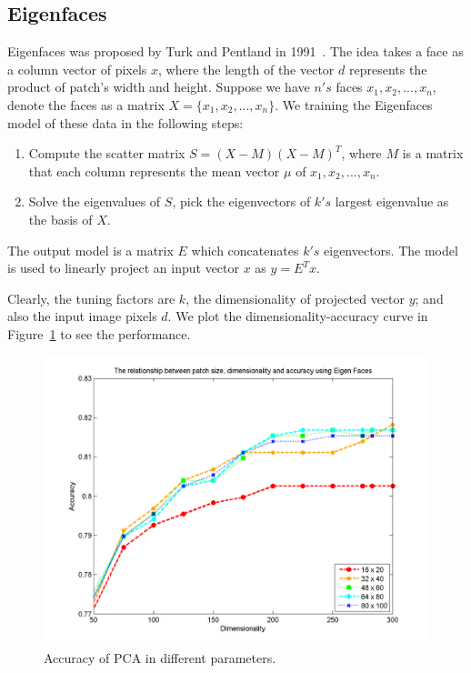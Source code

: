\documentclass[10pt,twocolumn,letterpaper]{article}
\begin{document}
\subsection{Eigenfaces}
Eigenfaces was proposed by Turk and Pentland in 1991~\cite{Turk1991}. The idea takes a face
as a column vector of pixels $x$, where the length of the vector $d$ represents
the product of patch's width and height.
Suppose we have $n's$ faces $x_1, x_2, ..., x_n$,
denote the faces as a matrix $X=\{x_1, x_2, ..., x_n\}$.
We training the Eigenfaces model of these data in the following steps:
\begin{center}
    \begin{enumerate}
        \item Compute the scatter matrix $S=(X-M)(X-M)^T$, where $M$ is a matrix
              that each column represents the mean vector $\mu$ of $x_1, x_2, ..., x_n$.
        \item Solve the eigenvalues of $S$, pick the eigenvectors of $k's$ 
              largest eigenvalue as the basis of $X$.
    \end{enumerate}
\end{center}
The output model is a matrix $E$ which concatenates $k's$ eigenvectors.
The model is used to linearly project an input vector $x$ as $y=E^Tx$.

Clearly, the tuning factors are $k$, the dimensionality of projected vector $y$; and
also the input image pixels $d$.
We plot the dimensionality-accuracy curve in Figure~\ref{fig:pca_par}
to see the performance.

\begin{figure}[t]
    \begin{center}
        \includegraphics[width=0.8\linewidth]{fig/pca/pca_par.png}
    \end{center}
    \caption{Accuracy of PCA in different parameters.}
    \label{fig:pca_par}
\end{figure}
\end{document}
